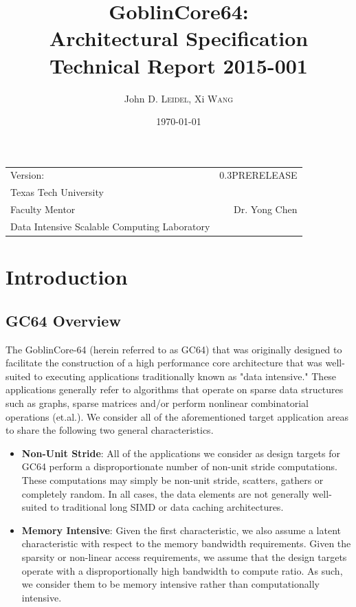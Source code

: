 \documentclass{article}
\title{GoblinCore64: \\ Architectural Specification \\ Technical Report 2015-001} %
\author{John D. \textsc{Leidel}, Xi \textsc{Wang}}
\date{\today} %
\begin{document}
\maketitle %

\begin{center}
\begin{tabular}{l r}
Version: & 0.3PRERELEASE \\ %
Texas Tech University \\ %
Faculty Mentor & Dr. Yong Chen \\
Data Intensive Scalable Computing Laboratory \\ %


\end{tabular}
\end{center}

\newpage

\tableofcontents

\newpage

\section{Introduction}

\subsection{GC64 Overview}

The GoblinCore-64 (herein referred to as GC64) that was originally designed to 
facilitate the construction of a high performance core architecture that was
well-suited to executing applications traditionally known as "data intensive."  
These applications generally refer to algorithms that operate on sparse
data structures such as graphs, sparse matrices and/or perform nonlinear 
combinatorial operations (et.al.).  We consider all of the aforementioned target
application areas to share the following two general characteristics.  

\begin{itemize}
\item \textbf{Non-Unit Stride}: All of the applications we consider as design targets
for GC64 perform a disproportionate number of non-unit stride computations.  These 
  computations may simply be non-unit stride, scatters, gathers or completely random. 
  In all cases, the data elements are not generally well-suited to traditional 
  long SIMD or data caching architectures.
\item  \textbf{Memory Intensive}: Given the first characteristic, we also assume
  a latent characteristic with respect to the memory bandwidth requirements.  
  Given the sparsity or non-linear access requirements, we assume that the design 
  targets operate with a disproportionally high bandwidth to compute ratio.  As
  such, we consider them to be memory intensive rather than computationally
  intensive.  
\end{itemize} 
\end{document}
